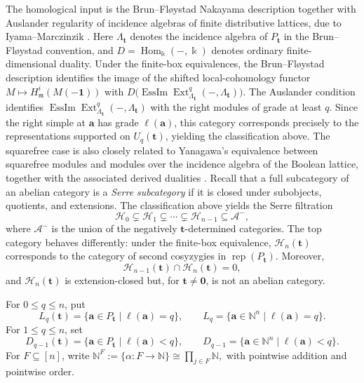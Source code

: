 \documentclass[12pt,reqno]{amsart}
\theoremstyle{definition}
\theoremstyle{remark}
\newcommand{\Rep}{\operatorname{rep}}
\newcommand{\Hom}{\operatorname{Hom}}
\newcommand{\Ext}{\operatorname{Ext}}
\newcommand{\EssIm}{\operatorname{EssIm}}
\begin{document}
The homological input is the Brun--Fl\o ystad Nakayama description together
with Auslander regularity of incidence algebras of finite distributive
lattices, due to Iyama--Marczinzik \cite{IM}.  Here
$\Lambda_{\mathbf t}$ denotes the incidence algebra of $P_{\mathbf t}$ in
the Brun--Fl\o ystad convention, and $D=\Hom_\Bbbk(-,\Bbbk)$ denotes ordinary
finite-dimensional duality.  Under the finite-box equivalences, the
Brun--Fl\o ystad description \cite{BF} identifies the image of the shifted
local-cohomology functor $M\mapsto H^i_{\mathfrak m}(M(-\mathbf1))$ with
$D\bigl(\EssIm\Ext^q_{\Lambda_{\mathbf t}}(-,\Lambda_{\mathbf t})\bigr)$.
The Auslander condition identifies
$\EssIm\Ext^q_{\Lambda_{\mathbf t}}(-,\Lambda_{\mathbf t})$ with the right
modules of grade at least $q$.  Since the right simple at $\mathbf a$ has
grade $\ell(\mathbf a)$, this category corresponds precisely to the
representations supported on $U_q(\mathbf t)$, yielding the classification
above.  The squarefree case is also closely related to Yanagawa's equivalence
between squarefree modules and modules over the incidence algebra of the
Boolean lattice, together with the associated derived dualities
\cite{Yanagawa}.
Recall that a full subcategory of an abelian category is a \emph{Serre
subcategory} if it is closed under subobjects, quotients, and extensions.
The classification above yields the Serre filtration
\[
\mathcal H_0\subsetneq\mathcal H_1\subsetneq\cdots\subsetneq
\mathcal H_{n-1}\subseteq\mathcal A^-,
\]
where $\mathcal A^-$ is the union of the negatively $\mathbf t$-determined
categories.  The top category behaves differently: under the finite-box
equivalence, $\mathcal H_n(\mathbf t)$ corresponds to the category of second
cosyzygies in $\Rep(P_{\mathbf t})$.  Moreover,
\[
\mathcal H_{n-1}(\mathbf t)\cap\mathcal H_n(\mathbf t)=0,
\]
and $\mathcal H_n(\mathbf t)$ is extension-closed but, for
$\mathbf t\ne\mathbf0$, is not an abelian category.

For $0\le q\le n$, put
\[
L_q(\mathbf t)=\{\mathbf a\in P_{\mathbf t}\mid\ell(\mathbf a)=q\},
\qquad
L_q=\{\mathbf a\in\mathbb N^n\mid\ell(\mathbf a)=q\}.
\]
For $1\le q\le n$, set
\[
D_{q-1}(\mathbf t)=\{\mathbf a\in P_{\mathbf t}\mid\ell(\mathbf a)<q\},
\qquad
D_{q-1}=\{\mathbf a\in\mathbb N^n\mid\ell(\mathbf a)<q\}.
\]
For $F\subseteq[n]$, write $
\mathbb N^F:=\{\alpha:F\longrightarrow\mathbb N\}
\cong\prod_{j\in F}\mathbb N,$
with pointwise addition and pointwise order.
\end{document}
